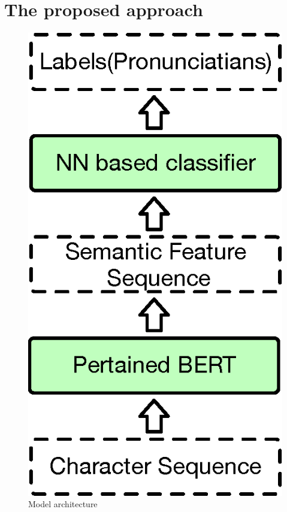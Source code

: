\documentclass[a4paper]{article}
\begin{document}
\section{The proposed approach}

\begin{figure}[t]
	\centering
	\includegraphics[scale=0.4]{pics3/architecture2.eps}
	\caption{Model architecture}
	\label{fig:model_architecture}
\end{figure}
\end{document}
